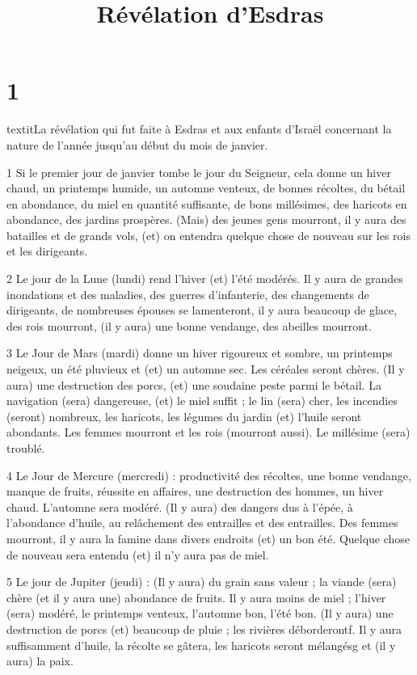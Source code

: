 

\title{Révélation d'Esdras}

\chapter{1}

\par textit{La révélation qui fut faite à Esdras et aux enfants d'Israël concernant la nature de l'année jusqu'au début du mois de janvier.}

\par 1 Si le premier jour de janvier tombe le jour du Seigneur, cela donne un hiver chaud, un printemps humide, un automne venteux, de bonnes récoltes, du bétail en abondance, du miel en quantité suffisante, de bons millésimes, des haricots en abondance, des jardins prospères. (Mais) des jeunes gens mourront, il y aura des batailles et de grands vols, (et) on entendra quelque chose de nouveau sur les rois et les dirigeants.

\par 2 Le jour de la Lune (lundi) rend l'hiver (et) l'été modérés. Il y aura de grandes inondations et des maladies, des guerres d'infanterie, des changements de dirigeants, de nombreuses épouses se lamenteront, il y aura beaucoup de glace, des rois mourront, (il y aura) une bonne vendange, des abeilles mourront.

\par 3 Le Jour de Mars (mardi) donne un hiver rigoureux et sombre, un printemps neigeux, un été pluvieux et (et) un automne sec. Les céréales seront chères. (Il y aura) une destruction des porcs, (et) une soudaine peste parmi le bétail. La navigation (sera) dangereuse, (et) le miel suffit ; le lin (sera) cher, les incendies (seront) nombreux, les haricots, les légumes du jardin (et) l'huile seront abondants. Les femmes mourront et les rois (mourront aussi). Le millésime (sera) troublé.

\par 4 Le Jour de Mercure (mercredi) : productivité des récoltes, une bonne vendange, manque de fruits, réussite en affaires, une destruction des hommes, un hiver chaud. L'automne sera modéré. (Il y aura) des dangers dus à l'épée, à l'abondance d'huile, au relâchement des entrailles et des entrailles. Des femmes mourront, il y aura la famine dans divers endroits (et) un bon été. Quelque chose de nouveau sera entendu (et) il n'y aura pas de miel.

\par 5 Le jour de Jupiter (jeudi) : (Il y aura) du grain sans valeur ; la viande (sera) chère (et il y aura une) abondance de fruits. Il y aura moins de miel ; l'hiver (sera) modéré, le printemps venteux, l'automne bon, l'été bon. (Il y aura) une destruction de porcs (et) beaucoup de pluie ; les rivières déborderontf. Il y aura suffisamment d’huile, la récolte se gâtera, les haricots seront mélangésg et (il y aura) la paix.

